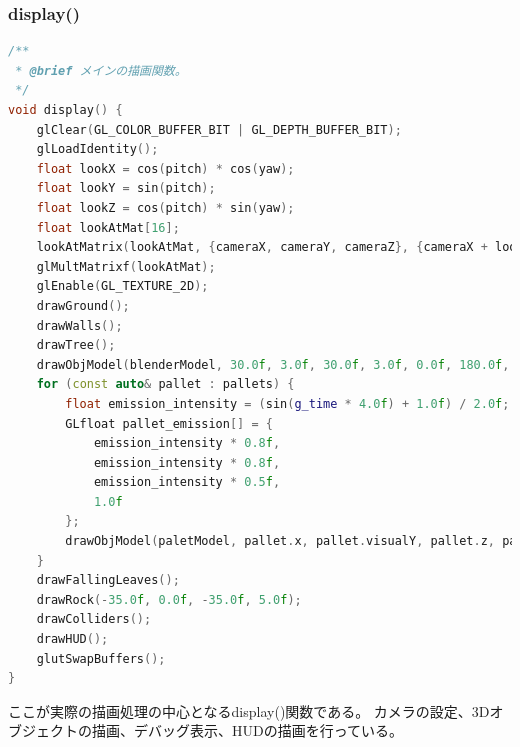 \documentclass[uplatex,dvipdfmx,a4paper]{jsarticle}
\begin{document}
\hypertarget{func:display}{}\subsubsection{display()}\label{func:display}
\begin{lstlisting}[language=C++, caption={display() 関数}, label={lst:display_detail}]
/**
 * @brief メインの描画関数。
 */
void display() {
    glClear(GL_COLOR_BUFFER_BIT | GL_DEPTH_BUFFER_BIT);
    glLoadIdentity();
    float lookX = cos(pitch) * cos(yaw);
    float lookY = sin(pitch);
    float lookZ = cos(pitch) * sin(yaw);
    float lookAtMat[16];
    lookAtMatrix(lookAtMat, {cameraX, cameraY, cameraZ}, {cameraX + lookX, cameraY + lookY, cameraZ + lookZ}, {0.0f, 1.0f, 0.0f});
    glMultMatrixf(lookAtMat);
    glEnable(GL_TEXTURE_2D);
    drawGround();
    drawWalls();
    drawTree();
    drawObjModel(blenderModel, 30.0f, 3.0f, 30.0f, 3.0f, 0.0f, 180.0f, 0.0f);
    for (const auto& pallet : pallets) {
        float emission_intensity = (sin(g_time * 4.0f) + 1.0f) / 2.0f;
        GLfloat pallet_emission[] = {
            emission_intensity * 0.8f, 
            emission_intensity * 0.8f, 
            emission_intensity * 0.5f, 
            1.0f
        };
        drawObjModel(paletModel, pallet.x, pallet.visualY, pallet.z, pallet.scale, pallet.rotationX, pallet.rotationY, pallet.rotationZ, pallet_emission);
    }
    drawFallingLeaves();
    drawRock(-35.0f, 0.0f, -35.0f, 5.0f); 
    drawColliders();
    drawHUD();
    glutSwapBuffers();
}
\end{lstlisting}
ここが実際の描画処理の中心となるdisplay()関数である。
カメラの設定、3Dオブジェクトの描画、デバッグ表示、HUDの描画を行っている。
\end{document}

